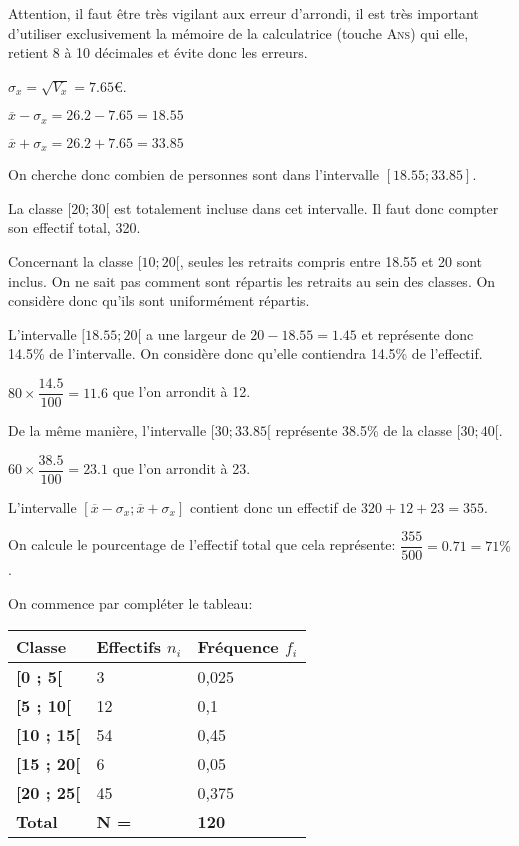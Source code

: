 \documentclass[a4paper,12pt]{scrartcl}
\begin{document}
Attention, il faut être très vigilant aux erreur d'arrondi, il est très important d'utiliser exclusivement la mémoire de la calculatrice (touche \textsc{Ans}) qui elle, retient 8 à 10 décimales et évite donc les erreurs.


$\sigma_x = \sqrt{V_x} = 7.65 \mbox{€}$.


$\overline{x}-\sigma_x = 26.2 - 7.65 = 18.55$

$\overline{x}+\sigma_x = 26.2 + 7.65 = 33.85$

On cherche donc combien de personnes sont dans l'intervalle $[18.55;33.85]$. 

La classe $[20;30[$ est totalement incluse dans cet intervalle. Il faut donc compter son effectif total, 320.

Concernant la classe $[10;20[$, seules les retraits compris entre 18.55 et 20 sont inclus. On ne sait pas comment sont répartis les retraits au sein des classes. On considère donc qu'ils sont uniformément répartis. 

L'intervalle $[18.55;20[$ a une largeur de $20 - 18.55 = 1.45$ et représente donc 14.5\% de l'intervalle. On considère donc qu'elle contiendra 14.5\% de l'effectif.

$80 \times \dfrac{14.5}{100} = 11.6$ que l'on arrondit à 12. 

De la même manière, l'intervalle $[30;33.85[$ représente 38.5\% de la classe $[30;40[$. 

$60 \times \dfrac{38.5}{100} = 23.1$ que l'on arrondit à 23.

L'intervalle $[\overline{x}-\sigma_x ; \overline{x}+\sigma_x]$ contient donc un effectif de $320 + 12 + 23 = 355$.

On calcule le pourcentage de l'effectif total que cela représente: $\dfrac{355}{500} = 0.71 = 71\%$. 


On commence par compléter le tableau:

\begin{center}
\begin{tabular}{@{}|l|l|l|@{}}
\toprule
\textbf{Classe} & \textbf{Effectifs $n_i$} & \textbf{Fréquence $f_i$} \\ \midrule
\textbf{{[}0 ; 5{[}} & 3 & 0,025 \\ \midrule
\textbf{{[}5 ; 10{[}} & 12 & 0,1 \\ \midrule
\textbf{{[}10 ; 15{[}} & 54 & 0,45 \\ \midrule
\textbf{{[}15 ; 20{[}} & 6 & 0,05 \\ \midrule
\textbf{{[}20 ; 25{[}} & 45 & 0,375 \\ \midrule
\textbf{Total} & \textbf{N =} & \textbf{120} \\ \bottomrule
\end{tabular}
\end{center}
\end{document}
